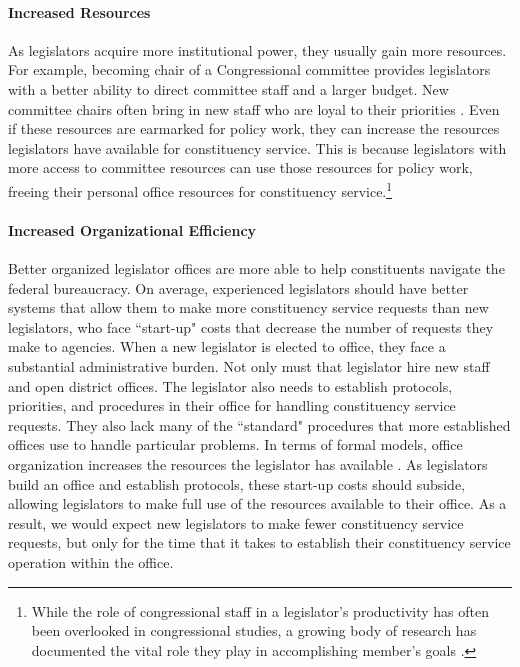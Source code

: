 \documentclass[12pt]{article}
\begin{document}
\paragraph{Increased Resources} As legislators acquire more institutional power, they usually gain more resources. For example, becoming chair of a Congressional committee provides legislators with a better ability to direct committee staff and a larger budget. New committee chairs often bring in new staff who are loyal to their priorities \citep{Fox1977, DeGregorio1995}. Even if these resources are earmarked for policy work, they can increase the resources legislators have available for constituency service. This is because legislators with more access to committee resources can use those resources for policy work, freeing their personal office resources for constituency service.\footnote{While the role of congressional staff in a legislator's productivity has often been overlooked in congressional studies, a growing body of research has documented the vital role they play in accomplishing member's goals \citep{HertelFernandez2019, MontgomeryNyhan2017, McCrain2018, CrossonEtAl2020, Reynolds2020}.}

\paragraph{Increased Organizational Efficiency} Better organized legislator offices are more able to help constituents navigate the federal bureaucracy. On average, experienced legislators should have better systems that allow them to make more constituency service requests than new legislators, who face ``start-up" costs that decrease the number of requests they make to agencies. When a new legislator is elected to office, they face a substantial administrative burden. Not only must that legislator hire new staff and open district offices. The legislator also needs to establish protocols, priorities, and procedures in their office for handling constituency service requests. They also lack many of the ``standard" procedures that more established offices use to handle particular problems. In terms of formal models, office organization increases the resources the legislator has available
\citep{AshworthBuenodeMesquita2006}. As legislators build an office and establish protocols, these start-up costs should subside, allowing legislators to make full use of the resources available to their office. As a result, we would expect new legislators to make fewer constituency service requests, but only for the time that it takes to establish their constituency service operation within the office.   
\end{document}

